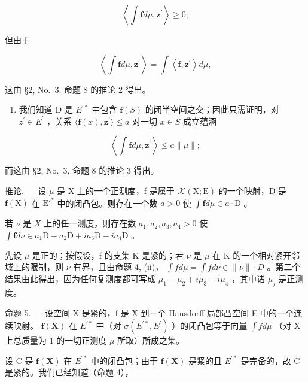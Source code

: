 \[
\left\langle \int \mathbf {f} d \mu , \mathbf {z} ^ {\prime} \right\rangle \geqslant 0;
\]

但由于

\[
\left\langle \int \mathbf {f} d \mu , \mathbf {z} ^ {\prime} \right\rangle = \int \left\langle \mathbf {f}, \mathbf {z} ^ {\prime} \right\rangle d \mu ,
\]

这由 §2, No.~3, 命题 8 的推论 2 得出。

\begin{enumerate}
\def\labelenumi{(\roman{enumi})}
\setcounter{enumi}{1}
\tightlist
\item
  我们知道 D 是 \(E^{\prime*}\) 中包含 \(\mathbf{f}(S)\) 的闭半空间之交；因此只需证明，对 \(z^{\prime} \in E^{\prime}\) ，关系 \(\langle\mathbf{f}(x), \mathbf{z}^{\prime}\rangle \leqslant a\) 对一切 \(x \in S\) 成立蕴涵
\end{enumerate}

\[
\left\langle \int \mathbf {f} d \mu , \mathbf {z} ^ {\prime} \right\rangle \leqslant a \| \mu \|;
\]

而这由 §2, No.~3, 命题 8 的推论 3 得出。

推论. --- 设 \(\mu\) 是 X 上的一个正测度，f 是属于 \(\mathcal{K}(\mathrm{X};\mathrm{E})\) 的一个映射，D 是 \(\mathbf{f}(\mathrm{X})\) 在 \(\mathrm{E}'^*\) 中的闭凸包。则存在一个数 \(a > 0\) 使 \(\int \mathbf{f} d\mu \in a \cdot \mathrm{D}\) 。

若 \(\nu\) 是 \(X\) 上的任一测度，则存在数 \(a_1, a_2, a_3, a_4 > 0\) 使 \(\int \mathbf{f} d\nu \in a_1\mathrm{D} - a_2\mathrm{D} + ia_3\mathrm{D} - ia_4\mathrm{D}\) 。

先设 \(\mu\) 是正的；按假设，f 的支集 K 是紧的；若 \(\nu\) 是 \(\mu\) 在 K 的一个相对紧开邻域上的限制，则 \(\nu\) 有界，且由命题 4, (ii)， \(\int f d\mu = \int f d\nu \in \|\nu\| \cdot D\) 。第二个结果由此得出，因为任何复测度都可写成 \(\mu_{1} - \mu_{2} + i\mu_{3} - i\mu_{4}\) ，其中诸 \(\mu_{j}\) 是正测度。

命题 5. --- 设空间 X 是紧的，f 是 X 到一个 Hausdorff 局部凸空间 E 中的一个连续映射。 \(\mathbf{f}(\mathbf{X})\) 在 \(E^{\prime*}\) 中（对 \(\sigma(E^{\prime*}, E^{\prime})\) ）的闭凸包等于向量 \(\int f d\mu\) （对 X 上总质量为 1 的一切正测度 \(\mu\) 所取）所成之集。

设 C 是 \(\mathbf{f}(\mathbf{X})\) 在 \(E^{\prime*}\) 中的闭凸包；由于 \(\mathbf{f}(\mathbf{X})\) 是紧的且 \(E^{\prime*}\) 是完备的，故 C 是紧的。我们已经知道（命题 4），

